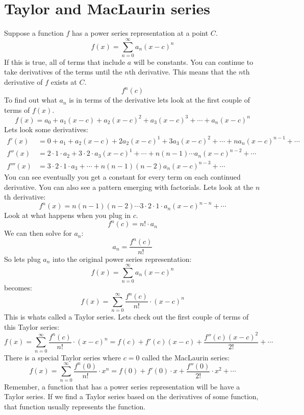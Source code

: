 \documentclass{report}
\begin{document}
\section{Taylor and MacLaurin series}
    Suppose a function \(f\) has a power series representation at a point \(C\).
    \[f(x) = \sum_{n=0}^{\infty} a_n(x-c)^n\]
    If this is true, all of terms that include \(a\) will be constants. 
    You can continue to take derivatives of the terms until the \(n\)th derivative.
    This means that the \(n\)th derivative of \(f\) exists at \(C\).
    \[f^n(c)\]
    To find out what \(a_n\) is in terms of the derivative lets look at the first couple of terms of \(f(x)\).
    \[f(x) = a_0 + a_1(x-c) + a_2(x-c)^2 + a_3(x-c)^3 + \cdots + a_n(x-c)^n\]
    Lets look some derivatives:
    \begin{align*}
        f'(x) &= 0 + a_1 + a_2(x-c) + 2a_2(x-c)^1 + 3a_3(x-c)^2 + \cdots + na_n(x-c)^{n-1} + \cdots \\
        f''(x) &= 2 \cdot 1 \cdot a_2 + 3 \cdot 2 \cdot a_3(x-c)^1 + \cdots + n(n-1) \cdots a_n (x-c)^{n-2} + \cdots \\
        f'''(x) &= 3 \cdot 2 \cdot 1 \cdot a_3 + \cdots + n(n-1)(n-2)a_n(x-c)^{n-3} + \cdots
    \end{align*}
    You can see eventually you get a constant for every term on each continued derivative.
    You can also see a pattern emerging with factorials.
    Lets look at the \(n\)th derivative:
    \[f^n(x) = n(n-1)(n-2) \cdots 3 \cdot 2 \cdot 1 \cdot a_n (x-c)^{n-n} + \cdots\]
    Look at what happens when you plug in \(c\).
    \[f^n(c) = n! \cdot a_n  \]
    We can then solve for \(a_n\):
    \[a_n = \frac{f^n(c)}{n!}\]
    So lets plug \(a_n\) into the original power series representation:
    \[f(x) = \sum_{n=0}^{\infty} a_n(x-c)^n\]
    becomes:
    \[f(x) = \sum_{n=0}^{\infty} \frac{f^n(c)}{n!} \cdot (x-c)^n\]
    This is whats called a Taylor series.
    Lets check out the first couple of terms of this Taylor series:
    \[f(x) = \sum_{n=0}^{\infty} \frac{f^n(c)}{n!} \cdot (x-c)^n = f(c) + f'(c)(x-c) + \frac{f''(c)(x-c)^2}{2!} + \cdots\]
    There is a special Taylor series where \(c = 0\) called the MacLaurin series:
    \[f(x) = \sum_{n=0}^{\infty} \frac{f^n(0)}{n!} \cdot x^n = f(0) + f'(0) \cdot x + \frac{f''(0)}{2!}\cdot x^2 + \cdots\]
    Remember, a function that has a power series representation will be have a Taylor series.
    If we find a Taylor series based on the derivatives of some function, that function usually represents the function.
    
\end{document}
